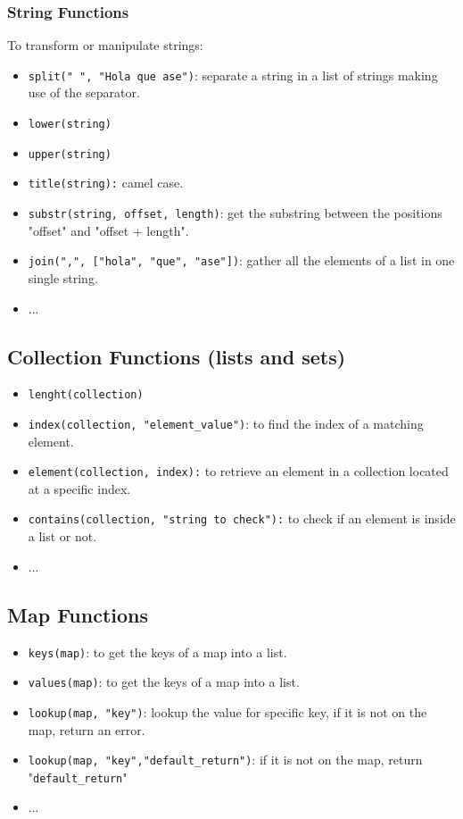\documentclass{article}
\begin{document}
\subsubsection{String Functions}
To transform or manipulate strings:
\begin{itemize}
    \item \verb+split(" ", "Hola que ase")+: separate a string in a list of strings making use of the separator.
    \item \verb+lower(string)+
    \item \verb+upper(string)+
    \item \verb|title(string):| camel case.
    \item \verb|substr(string, offset, length)|: get the substring between the positions "offset" and "offset + length".
    \item \verb|join(",", ["hola", "que", "ase"])|: gather all the elements of a list in one single string.
    \item ...
\end{itemize}

\subsection{Collection Functions (lists and sets)}
\begin{itemize}
    \item \verb|lenght(collection)|
    \item \verb|index(collection, "element_value")|: to find the index of a matching element.
    \item \verb|element(collection, index):| to retrieve an element in a collection located at a specific index.
    \item \verb|contains(collection, "string to check"):| to check if an element is inside a list or not.
    \item ...
\end{itemize}

\subsection{Map Functions}
\begin{itemize}
    \item \verb|keys(map)|: to get the keys of a map into a list.
    \item \verb|values(map)|: to get the keys of a map into a list.
    \item \verb|lookup(map, "key")|: lookup the value for specific key, if it is not on the map, return an error.
    \item \verb|lookup(map, "key","default_return")|: if it is not on the map, return "\verb|default_return|"
    \item ...
\end{itemize}
\end{document}
